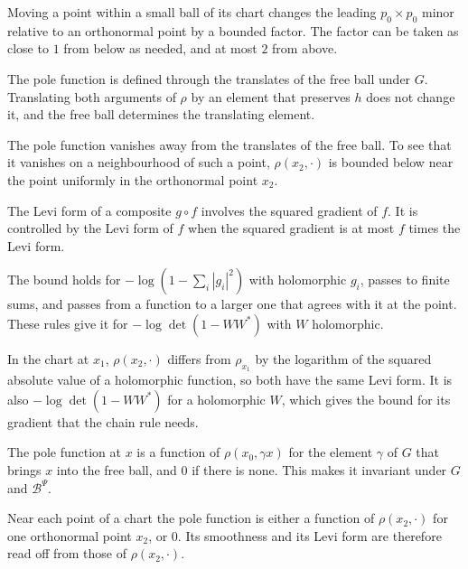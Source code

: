 Moving a point within a small ball of its chart changes the leading $p_0\times p_0$ minor relative to an
orthonormal point by a bounded factor. The factor can be taken as close to $1$ from below as needed, and at most
$2$ from above.

The pole function is defined through the translates of the free ball under $G$. Translating both arguments of
$\rho$ by an element that preserves $h$ does not change it, and the free ball determines the translating element.

The pole function vanishes away from the translates of the free ball. To see that it vanishes on a
neighbourhood of such a point, $\rho(x_2,\cdot)$ is bounded below near the point uniformly in the orthonormal
point $x_2$.

The Levi form of a composite $g\circ f$ involves the squared gradient of $f$. It is controlled by the Levi form
of $f$ when the squared gradient is at most $f$ times the Levi form.

The bound holds for $-\log(1-\sum_i|g_i|^2)$ with holomorphic $g_i$, passes to finite sums, and passes from a
function to a larger one that agrees with it at the point. These rules give it for $-\log\det(1-WW^*)$ with $W$
holomorphic.

In the chart at $x_1$, $\rho(x_2,\cdot)$ differs from $\rho_{x_1}$ by the logarithm of the squared absolute value
of a holomorphic function, so both have the same Levi form. It is also $-\log\det(1-WW^*)$ for a holomorphic
$W$, which gives the bound for its gradient that the chain rule needs.

The pole function at $x$ is a function of $\rho(x_0,\gamma x)$ for the element $\gamma$ of $G$ that brings $x$
into the free ball, and $0$ if there is none. This makes it invariant under $G$ and $\mathcal B^\Psi$.

Near each point of a chart the pole function is either a function of $\rho(x_2,\cdot)$ for one orthonormal
point $x_2$, or $0$. Its smoothness and its Levi form are therefore read off from those of $\rho(x_2,\cdot)$.

